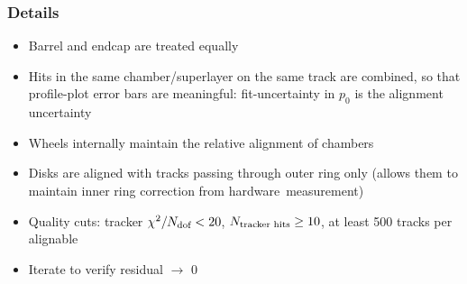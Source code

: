\documentclass[compress]{beamer}
\begin{document}
\begin{frame}
\frametitle{Details}
\begin{itemize}\setlength{\itemsep}{0.3 cm}
\item Barrel and endcap are treated equally

\item Hits in the same chamber/superlayer on the same track are
  combined, so that profile-plot error bars are meaningful:
  fit-uncertainty in $p_0$ is the alignment uncertainty

\item Wheels internally maintain the relative alignment of chambers

\item Disks are aligned with tracks passing through outer ring only
  (allows them to maintain inner ring correction from \mbox{hardware measurement)\hspace{-1 cm}}

\item Quality cuts: tracker $\chi^2/N_{\mbox{\scriptsize dof}} < 20$,
  $N_{\mbox{\scriptsize tracker hits}} \ge 10$, at least 500 tracks
  per alignable

\item Iterate to verify residual $\to$ 0

\end{itemize}
\end{frame}
\end{document}
